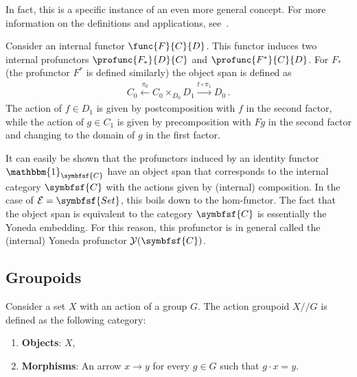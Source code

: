     In fact, this is a specific instance of an even more general concept. For more information on the definitions and applications, see~\citet{mac_lane_categories_2013, johnstone_topos_2014}.

    \begin{construct}
        Consider an internal functor $\func{F}{C}{D}$. This functor induces two internal profunctors $\profunc{F_*}{D}{C}$ and $\profunc{F^*}{C}{D}$. For $F_*$ (the profunctor $F^*$ is defined similarly) the object span is defined as
        \begin{gather}
            C_0\overset{\pi_0}{\longleftarrow}C_0\times_{D_0} D_1\overset{t\circ\pi_1}{\longrightarrow}D_0\,.
        \end{gather}
        The action of $f\in D_1$ is given by postcomposition with $f$ in the second factor, while the action of $g\in C_1$ is given by precomposition with $Fg$ in the second factor and changing to the domain of $g$ in the first factor.

        It can easily be shown that the profunctors induced by an identity functor $\mathbbm{1}_{\symbfsf{C}}$ have an object span that corresponds to the internal category $\symbfsf{C}$ with the actions given by (internal) composition. In the case of $\mathcal{E}=\symbfsf{Set}$, this boils down to the hom-functor. The fact that the object span is equivalent to the category $\symbfsf{C}$ is essentially the Yoneda embedding. For this reason, this profunctor is in general called the (internal) Yoneda profunctor $\mathcal{Y}(\symbfsf{C})$.
    \end{construct}

\subsection{Groupoids}\label{section:groupoids}


    \begin{example}\label{cat:action_groupoid}
        Consider a set $X$ with an action of a group $G$. The action groupoid $X/\!\!/G$ is defined as the following category:
        \begin{enumerate}
            \item\textbf{Objects}: $X$,
            \item\textbf{Morphisms}: An arrow $x\rightarrow y$ for every $g\in G$ such that $g\cdot x=y$.
        \end{enumerate}
    \end{example}

